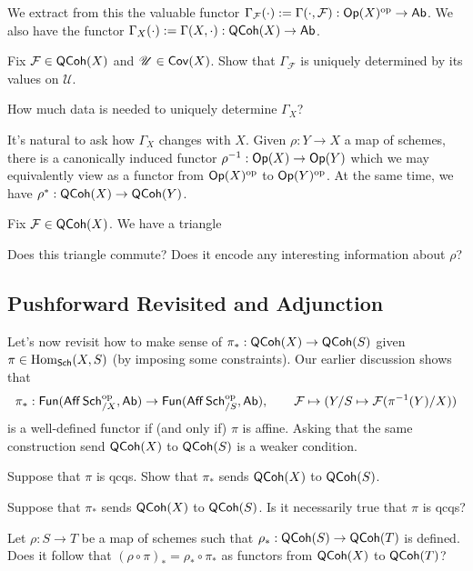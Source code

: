 \documentclass[11pt]{article}
\renewcommand{\F}{\mathcal{F}}
\newcommand{\U}{\mathscr{U}}
\begin{document}
We extract from this the valuable functor $\Gamma_{\F}(\cdot):=\Gamma(\cdot,\F): \Op(X)^{\op}\to\Ab$. We also have the functor $\Gamma_X(\cdot):=\Gamma(X,\cdot): \operatorname{\mathsf{QCoh}}(X)\to\operatorname{\mathsf{Ab}}$.

\begin{exercise}
Fix $\F\in\QCoh(X)$ and $\U\in\Cov(X)$. Show that $\Gamma_{\F}$ is uniquely determined by its values on $\U$.
\end{exercise}

\begin{exercise}
How much data is needed to uniquely determine $\Gamma_X$?
\end{exercise}

It's natural to ask how $\Gamma_X$ changes with $X$. Given $\rho: Y\to X$ a map of schemes, there is a canonically induced functor $\rho^{-1}: \operatorname{\mathsf{Op}}(X)\to\operatorname{\mathsf{Op}}(Y)$ which we may equivalently view as a functor from $\operatorname{\mathsf{Op}}(X)^{\operatorname{op}}$ to $\operatorname{\mathsf{Op}}(Y)^{\operatorname{op}}$. At the same time, we have $\rho^*: \operatorname{\mathsf{QCoh}}(X)\to\operatorname{\mathsf{QCoh}}(Y)$. 

\begin{exercise}
Fix $\F\in\QCoh(X)$. We have a triangle
\begin{center}
\end{center}
Does this triangle commute? Does it encode any interesting information about $\rho$?
\end{exercise}

\subsection{Pushforward Revisited and Adjunction}
Let's now revisit how to make sense of $\pi_*: \operatorname{\mathsf{QCoh}}(X)\to\operatorname{\mathsf{QCoh}}(S)$ given $\pi\in\operatorname{Hom}_{\operatorname{\mathsf{Sch}}}(X,S)$ (by imposing some constraints). Our earlier discussion shows that
$$\pi_*: \Fun(\Aff\Sch_{/X}^{\op},\Ab)\to\Fun(\Aff\Sch_{/S}^{\op},\Ab),\qquad \F\mapsto(Y/S\mapsto\F(\pi^{-1}(Y)/X))$$
is a well-defined functor if (and only if) $\pi$ is affine. Asking that the same construction send $\operatorname{\mathsf{QCoh}}(X)$ to $\operatorname{\mathsf{QCoh}}(S)$ is a weaker condition.

\begin{exercise}
\hfill
\begin{enum}{\alph}
\item Suppose that $\pi$ is qcqs. Show that $\pi_*$ sends $\operatorname{\mathsf{QCoh}}(X)$ to $\operatorname{\mathsf{QCoh}}(S)$.

\item Suppose that $\pi_*$ sends $\operatorname{\mathsf{QCoh}}(X)$ to $\operatorname{\mathsf{QCoh}}(S)$. Is it necessarily true that $\pi$ is qcqs?

\item Let $\rho: S\to T$ be a map of schemes such that $\rho_*: \operatorname{\mathsf{QCoh}}(S)\to\operatorname{\mathsf{QCoh}}(T)$ is defined. Does it follow that $(\rho\circ\pi)_*=\rho_*\circ\pi_*$ as functors from $\operatorname{\mathsf{QCoh}}(X)$ to $\operatorname{\mathsf{QCoh}}(T)$?
\end{enum}
\end{exercise}
\end{document}
